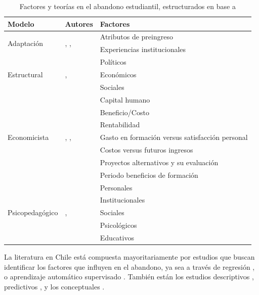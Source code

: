 \documentclass[portuguese]{textolivre}
\begin{document}
\begin{table}[htpb] %
  \caption{Factores y teorías en el abandono estudiantil, estructurados en base a \cite{Cabrera2006}}
  \label{Tabla 1} %
  \begin{tabular}{llp{5cm}}
  \toprule %
  Modelo & Autores & Factores \\
  \midrule %
  \multirow{2}{*}{Adaptación}  &
  \multirow{2}{6cm}{\cite{Tinto1993}, \cite{Bean1985}, \cite{Nora2002}} & Atributos de preingreso \\
  & & Experiencias institucionales \\
  \cmidrule{1-3}
  \multirow{3}{*}{Estructural}  &
  \multirow{3}{4cm}{\cite{Thomas2002}, \cite{Lujan1981}} & Políticos \\
 & & Económicos \\
 & & Sociales \\
  \cmidrule{1-3}
  \multirow{7}{*}{Economicista}  &
  \multirow{7}{4cm}{\cite{Schultz1962}, \cite{Becker1962}, \cite{Thurow1973}} & Capital humano \\
 & & Beneficio/Costo \\
 & & Rentabilidad \\
 & & Gasto en formación versus satisfacción personal \\
 & & Costos versus futuros ingresos \\
 & & Proyectos alternativos y su evaluación \\
 & & Periodo beneficios de formación \\

  \cmidrule{1-3}
  \multirow{5}{*}{Psicopedagógico}  &
  \multirow{5}{4cm}{\cite{Ryan2003}, \cite{GonzalezF2005}} & Personales \\
  & & Institucionales \\
  & & Sociales \\
  & & Psicológicos \\
  & & Educativos \\
 
  \bottomrule %
  \end{tabular}
\end{table}



La literatura en Chile está compuesta mayoritariamente por estudios que buscan identificar los factores que influyen en el abandono, ya sea a través de regresión \cite{BarriosF2011,Larroucau2015,Henriquez2016,Carvajal2018}, o aprendizaje automático supervisado \cite{Miranda2017,Maldonado2021}. También están los estudios descriptivos \cite{GonzalezF2005,Gonzalez2018a}, predictivos \cite{Hofflinger2020,Velasquez2014}, y los conceptuales \cite{Himmel2002,DiazPeralta2008}.
\end{document}
